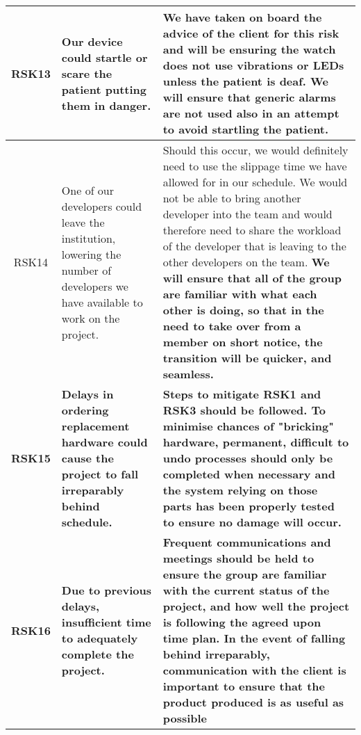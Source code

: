 \begin{xltabular}[H]{\textwidth}{c | X | X}
    \midrule

    RSK13

    &

    Our device could startle or scare the patient putting them in danger.

    &

    We have taken on board the advice of the client for this risk and will be ensuring the watch does not use vibrations or LEDs unless the patient is deaf. We will ensure that generic alarms are not used also in an attempt to avoid startling the patient.\\

    \midrule

    RSK14

    &

    One of our developers could leave the institution, lowering the number of developers we have available to work on the project.

    &

    Should this occur, we would definitely need to use the slippage time we have allowed for in our schedule. We would not be able to bring another developer into the team and would therefore need to share the workload of the developer that is leaving to the other developers on the team. \textbf{We will ensure that all of the group are familiar with what each other is doing, so that in the need to take over from a member on short notice, the transition will be quicker, and seamless. }\\
    
    \midrule

    \textbf{RSK15}

    &

    \textbf{Delays in ordering replacement hardware could cause the project to fall irreparably behind schedule.}

    &

   \textbf{Steps to mitigate RSK1 and RSK3 should be followed. To minimise chances of "bricking" hardware, permanent, difficult to undo processes should only be completed when necessary and the system relying on those parts has been properly tested to ensure no damage will occur.} \\
   
    \midrule

    \textbf{RSK16}

    &

    \textbf{Due to previous delays, insufficient time to adequately complete the project.}

    &

   \textbf{Frequent communications and meetings should be held to ensure the group are familiar with the current status of the project, and how well the project is following the agreed upon time plan. In the event of falling behind irreparably, communication with the client is important to ensure that the product produced is as useful as possible} \textbf{} \\

\end{xltabular}
\label{tbl:risk_table}
